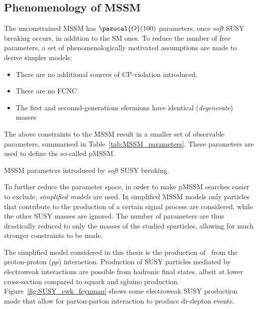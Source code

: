 	\subsection{Phenomenology of MSSM}\label{subsec:SUSY_decay}
	The unconstrained \ac{MSSM} has $\pazocal{O}(100)$ parameters, once \textit{soft} \ac{SUSY} breaking occurs, in addition to the \ac{SM} ones. 
	To reduce the number of free parameters, a set of phenomenologically motivated assumptions are made to derive simpler models:
	\begin{itemize}
	\item There are no additional sources of CP-violation introduced.
	\item There are no \ac{FCNC}
	\item The first and seconnd-generations sfermions have identical (\textit{degenerate}) masses~\cite{Bona_2008} 
	\end{itemize}
	 The above constraints to the \ac{MSSM} result in a smaller set of observable parameters, summarised in Table~\ref{tab:MSSM_parameters}. These parameters are used to define the so-called \ac{pMSSM}.
	\begin{table}[!h]
		\centering
		\caption{\ac{MSSM} parameters introduced by \textit{soft} \ac{SUSY} breaking. }
			
		\label{tab:MSSM_parameters}
	\end{table}
	
	To further reduce the parameter space, in order to make \ac{pMSSM} searches easier to exclude, \textit{simplified models} are used. 
	In simplified \ac{MSSM} models only particles that contribute to the production of a certain signal process are considered, while the other \ac{SUSY} masses are ignored. The number of parameters are thus drastically reduced to only the masses of the studied sparticles, allowing for much stronger constraints to be made.
	
	The simplified model considered in this thesis is the production of \stau\  from the proton-proton ($pp$) interaction. 
	Production of \ac{SUSY} particles mediated by electroweak interactions are possible from hadronic final states, albeit at lower cross-section compared to squark and sgluino production. 
	 Figure~\ref{fig:SUSY_ewk_feynman} shows some electroweak \ac{SUSY} production mode that allow for parton-parton interaction to produce di-slepton events.
	\SUSYewkfeynman
	

